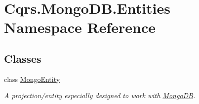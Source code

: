 \hypertarget{namespaceCqrs_1_1MongoDB_1_1Entities}{}\section{Cqrs.\+Mongo\+D\+B.\+Entities Namespace Reference}
\label{namespaceCqrs_1_1MongoDB_1_1Entities}
\subsection*{Classes}
\begin{DoxyCompactItemize}
\item 
class \hyperlink{classCqrs_1_1MongoDB_1_1Entities_1_1MongoEntity}{Mongo\+Entity}
\begin{DoxyCompactList}\small\item\em A projection/entity especially designed to work with \hyperlink{namespaceCqrs_1_1MongoDB}{Mongo\+DB}. \end{DoxyCompactList}\end{DoxyCompactItemize}
